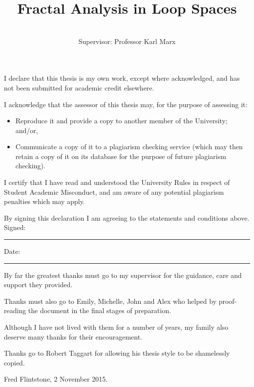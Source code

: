 \documentclass[honours,12pt]{unswthesis}
\title{Fractal Analysis in Loop Spaces}
\author{\authornameonly\\{\bigskip}Supervisor: Professor Karl Marx}
\newcommand\blankpage{%
    \null
    \thispagestyle{empty}%
    \addtocounter{page}{-1}%
    \newpage}
\numberwithin{equation}{section}
\begin{document}
\beforepreface

\afterpage{\blankpage}



\vskip 10pc \noindent I declare that this thesis is my
own work, except where acknowledged, and has not been submitted for
academic credit elsewhere. 

\vskip 2pc  \noindent I acknowledge that the assessor of this
thesis may, for the purpose of assessing it:
\begin{itemize}
\item Reproduce it and provide a copy to another member of the University; and/or,
\item Communicate a copy of it to a plagiarism checking service (which may then retain a copy of it on its database for the purpose of future plagiarism checking).
\end{itemize}

\vskip 2pc \noindent I certify that I have read and understood the University Rules in
respect of Student Academic Misconduct, and am aware of any potential plagiarism penalties which may 
apply.\vspace{24pt}

\vskip 2pc \noindent By signing 
this declaration I am
agreeing to the statements and conditions above.
\vskip 2pc \noindent
Signed: \rule{7cm}{0.25pt} \hfill Date: \rule{4cm}{0.25pt} \newline
\vskip 1pc

\afterpage{\blankpage}




{\bigskip}By far the greatest thanks must go to my supervisor for
the guidance, care and support they provided. 

{\bigskip\noindent}Thanks 
must also go to Emily, Michelle, John and Alex who helped by
proof-reading the document in the final stages of preparation.

{\bigskip\noindent}Although
I have not lived with them for a number of years, my family also deserve
many thanks for their encouragement.

{\bigskip\noindent} Thanks go to Robert Taggart for allowing his thesis
style to be shamelessly copied.

{\bigskip\bigskip\bigskip\noindent} Fred Flintstone, 2 November 2015.

\afterpage{\blankpage}
\end{document}
